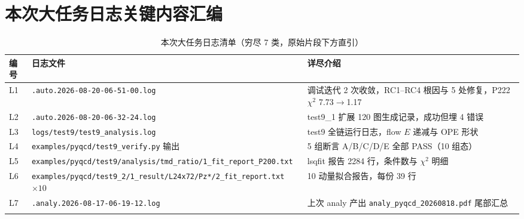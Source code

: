 \documentclass[UTF8]{ctexart}
\begin{document}
\section{本次大任务日志关键内容汇编}
\label{sec:logs}
\tiny
\begin{xltabular}{\textwidth}{llX}
\toprule
编号 & 日志文件 & 详尽介绍 \\
\midrule
\endhead
L1 & \texttt{\nolinkurl{.auto.2026-08-20-06-51-00.log}} & 调试迭代 2 次收敛，RC1--RC4 根因与 5 处修复，P222 $\chi^2$ 7.73$\to$1.17 \\
L2 & \texttt{\nolinkurl{.auto.2026-08-20-06-32-24.log}} & test9\_1 扩展 120 图生成记录，成功但埋 4 错误 \\
L3 & \texttt{\nolinkurl{logs/test9/test9\_analysis.log}} & test9 全链运行日志，flow $E$ 递减与 OPE 形状 \\
L4 & \texttt{\nolinkurl{examples/pyqcd/test9\_verify.py}} 输出 & 5 组断言 A/B/C/D/E 全部 PASS（10 组态）\\
L5 & \texttt{\nolinkurl{examples/pyqcd/test9/analysis/tmd\_ratio/1\_fit\_report\_P200.txt}} & lsqfit 报告 2284 行，条件数与 $\chi^2$ 明细 \\
L6 & \texttt{\nolinkurl{examples/pyqcd/test9\_2/1\_result/L24x72/Pz*/2\_fit\_report.txt}} $\times10$ & 10 动量拟合报告，每份 39 行 \\
L7 & \texttt{\nolinkurl{.analy.2026-08-17-06-19-12.log}} & 上次 analy 产出 \texttt{\nolinkurl{analy\_pyqcd\_20260818.pdf}} 尾部汇总 \\
\bottomrule
\caption{本次大任务日志清单（穷尽 7 类，原始片段下方直引）}
\end{xltabular}




\end{document}
